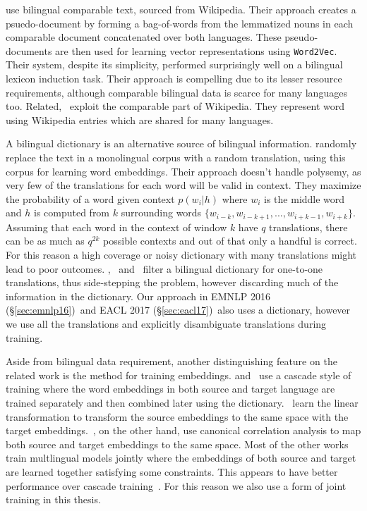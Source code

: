 \documentclass[12pt,twoside,final,hidelinks]{ltthesis}
\theoremstyle{definition}
\newcommand\emnlpvi{EMNLP 2016 (\S\ref{sec:emnlp16})}
\newcommand\eaclvii{EACL 2017 (\S\ref{sec:eacl17})}
\begin{document}
 use bilingual comparable text, sourced from Wikipedia. 
Their approach creates a psuedo-document by forming a bag-of-words from the lemmatized nouns in each comparable document concatenated over both languages.
These pseudo-documents are then used for learning vector representations using \texttt{Word2Vec}.
Their system, despite its simplicity, performed surprisingly well on a bilingual lexicon induction task. 
Their approach is compelling due to its lesser resource requirements, although comparable bilingual data is scarce for many languages too. 
Related,~ exploit the comparable part of Wikipedia. They represent word using Wikipedia entries which are shared for many languages. 

A bilingual dictionary is an alternative source of bilingual information.
 randomly replace the text in a monolingual corpus with a random translation, using this corpus for learning word embeddings. 
Their approach doesn't handle polysemy, as very few of the translations for each word will be valid in context. 
They maximize the probability of a word given context $p(w_i|h)$ where $w_i$ is the middle word and $h$ is computed from $k$ surrounding words $\{w_{i-k}, w_{i-k+1}, ... , w_{i+k-1}, w_{i+k}\}$. 
Assuming that each word in the context of window $k$ have $q$ translations, there can be as much as $q^{2k}$ possible contexts and out of that only a handful is correct. 
For this reason a high coverage or noisy dictionary with many translations might lead to poor outcomes.
,~ and~ filter a bilingual dictionary for one-to-one translations, thus side-stepping the problem, however discarding much of the information in the dictionary. 
Our approach in \emnlpvi\ and \eaclvii\ also uses a dictionary, however we use all the translations and explicitly disambiguate translations during training. 

Aside from bilingual data requirement, another distinguishing feature on the related work is the method for training embeddings.
 and~ use a cascade style of training where the word embeddings in both source and target 
language are trained separately and then combined later using the dictionary.~ learn the linear transformation to transform 
the source embeddings to the same space with the target embeddings.~, on the other hand, use canonical correlation analysis to map 
both source and target embeddings to the same space. Most of the other works train multlingual models jointly where the embeddings of both source and target are 
learned together satisfying some constraints. This appears to have better performance over cascade training~\cite{icml2015_gouws15}. For this reason we also use a form of joint training in this thesis. 
\end{document}

